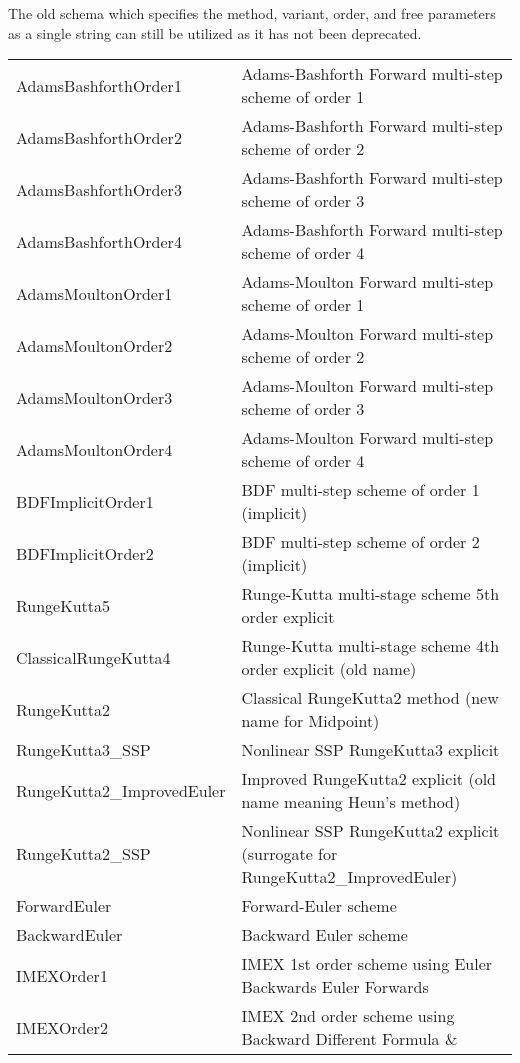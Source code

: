 The old schema which specifies the method, variant, order, and free
parameters as a single string can still be utilized as it has not been
deprecated.

\begin{center}
\footnotesize
\begin{tabular}{p{4cm}p{10cm}}
\toprule
AdamsBashforthOrder1 & Adams-Bashforth Forward multi-step scheme of order 1\\
AdamsBashforthOrder2 & Adams-Bashforth Forward multi-step scheme of order 2\\
AdamsBashforthOrder3 & Adams-Bashforth Forward multi-step scheme of order 3\\
AdamsBashforthOrder4 & Adams-Bashforth Forward multi-step scheme of order 4\\
AdamsMoultonOrder1   & Adams-Moulton Forward multi-step scheme of order 1\\
AdamsMoultonOrder2   & Adams-Moulton Forward multi-step scheme of order 2\\
AdamsMoultonOrder3   & Adams-Moulton Forward multi-step scheme of order 3\\
AdamsMoultonOrder4   & Adams-Moulton Forward multi-step scheme of order 4\\
BDFImplicitOrder1    & BDF multi-step scheme of order 1 (implicit)\\
BDFImplicitOrder2    & BDF multi-step scheme of order 2 (implicit)\\
RungeKutta5          & Runge-Kutta multi-stage scheme 5th order explicit\\
ClassicalRungeKutta4 & Runge-Kutta multi-stage scheme 4th order explicit (old name)\\
RungeKutta2          & Classical RungeKutta2 method (new name for Midpoint)\\
RungeKutta3\_SSP     & Nonlinear SSP RungeKutta3 explicit\\
RungeKutta2\_ImprovedEuler & Improved RungeKutta2 explicit (old name meaning Heun's method)\\
RungeKutta2\_SSP     & Nonlinear SSP RungeKutta2 explicit (surrogate for RungeKutta2\_ImprovedEuler)\\
ForwardEuler         & Forward-Euler scheme\\
BackwardEuler        & Backward Euler scheme\\
IMEXOrder1           & IMEX 1st order scheme using Euler Backwards Euler
                       Forwards \\
IMEXOrder2           & IMEX 2nd order scheme using Backward Different Formula \&

\end{tabular}
\end{center}
